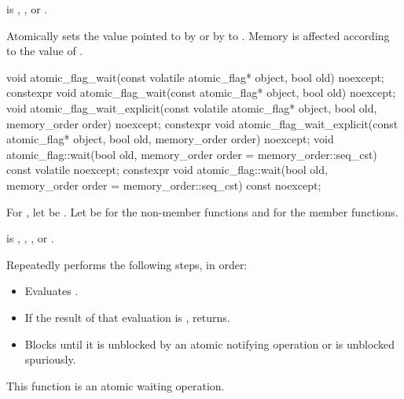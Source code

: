 \begin{itemdescr}
\pnum
\expects
{} is
,
, or
.

\pnum
\effects
Atomically sets the value pointed to by  or by  to
. Memory is affected according to the value of .
\end{itemdescr}

%
%
%
\begin{itemdecl}
void atomic_flag_wait(const volatile atomic_flag* object, bool old) noexcept;
constexpr void atomic_flag_wait(const atomic_flag* object, bool old) noexcept;
void atomic_flag_wait_explicit(const volatile atomic_flag* object,
                               bool old, memory_order order) noexcept;
constexpr void atomic_flag_wait_explicit(const atomic_flag* object,
                               bool old, memory_order order) noexcept;
void atomic_flag::wait(bool old, memory_order order =
                                   memory_order::seq_cst) const volatile noexcept;
constexpr void atomic_flag::wait(bool old, memory_order order =
                                   memory_order::seq_cst) const noexcept;
\end{itemdecl}

\begin{itemdescr}
\pnum
For ,
let  be .
Let  be  for the non-member functions and
 for the member functions.

\pnum
\expects
{} is
,
,
, or
.

\pnum
\effects
Repeatedly performs the following steps, in order:
\begin{itemize}
\item
  Evaluates .
\item
  If the result of that evaluation is , returns.
\item
  Blocks until it
  is unblocked by an atomic notifying operation or is unblocked spuriously.
\end{itemize}

\pnum
\remarks
This function is an atomic waiting operation.
\end{itemdescr}

